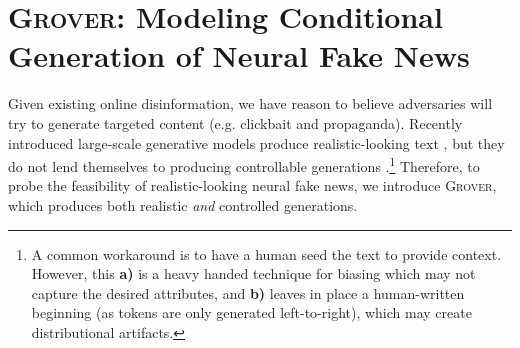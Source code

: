 \documentclass{article}
\newcommand{\modelname}{{\textsc{Grover}}}
\begin{document}
%
 
\section{\modelname: Modeling Conditional Generation of Neural Fake News}

\makeatletter
 \def\SOUL@hlpreamble{\setul{}{2.4ex}\let\SOUL@stcolor\SOUL@hlcolor
 \SOUL@stpreamble
 }
\makeatother


\newcommand{\hlc}[2][yellow]{{\colorlet{foo}{#1}\sethlcolor{foo}\hl{#2}}}


\newcommand{\metadata}{metadata}
\newcommand{\Metadata}{Metadata}

\newcommand{\tokenstart}{{\tt\small <start>}}
\newcommand{\tokenend}{{\tt\small <end>}}
\newcommand{\taustart}{{\tt\small <start>}}
\newcommand{\tauend}{{\tt\small <end>}}

\newcommand{\bodyfield}{\hlc[body]{body}}
\newcommand{\domainfield}{\hlc[domain]{domain}}
\newcommand{\datefield}{\hlc[date]{date}}
\newcommand{\authorsfield}{\hlc[authors]{authors}}
\newcommand{\authorfield}{\hlc[authors]{author}}
\newcommand{\headlinefield}{\hlc[headline]{headline}}
Given existing online disinformation, we have reason to believe adversaries will try to generate targeted content (e.g. clickbait and propaganda). Recently introduced large-scale generative models produce realistic-looking text \citep{radford2019gpttwo}, but they do not lend themselves to producing controllable generations \citep{hu2017toward}.\footnote{A common workaround is to have a human seed the text to provide context. However, this \textbf{a)} is a heavy handed technique for biasing which may not capture the desired attributes, and \textbf{b)} leaves in place a human-written beginning (as tokens are only generated left-to-right), which may create distributional artifacts.} 
Therefore, to probe the feasibility of realistic-looking neural fake news, we introduce \modelname, which produces both realistic \emph{and} controlled generations.
\end{document}
